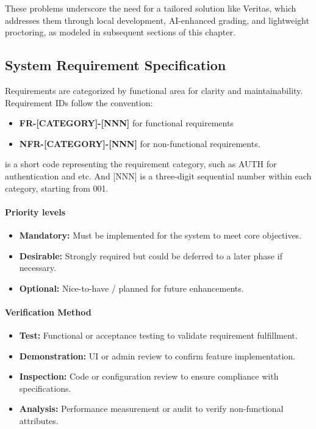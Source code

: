 These problems underscore the need for a tailored solution like Veritas, which addresses them through local development, AI-enhanced grading, and lightweight proctoring, as modeled in subsequent sections of this chapter.

\subsection{System Requirement Specification}
Requirements are categorized by functional area for clarity and maintainability. Requirement IDs follow the convention:
\begin{itemize}
    \item \textbf{FR-[CATEGORY]-[NNN]} for functional requirements 
    \item \textbf{NFR-[CATEGORY]-[NNN]} for non-functional requirements.
\end{itemize}

\noindent{[CATEGORY]} is a short code representing the requirement category, such as AUTH for authentication and etc. And 
[NNN] is a three-digit sequential number within each category, starting from 001.

\paragraph*{Priority levels}
\begin{itemize}
    \item \textbf{Mandatory:} Must be implemented for the system to meet core objectives.
    \item \textbf{Desirable:} Strongly required but could be deferred to a later phase if necessary.
    \item \textbf{Optional:} Nice-to-have / planned for future enhancements.
\end{itemize}

\paragraph*{Verification Method}
\begin{itemize}
    \item \textbf{Test:} Functional or acceptance testing to validate requirement fulfillment.
    \item \textbf{Demonstration:} UI or admin review to confirm feature implementation.
    \item \textbf{Inspection:} Code or configuration review to ensure compliance with specifications.
    \item \textbf{Analysis:} Performance measurement or audit to verify non-functional attributes.
\end{itemize}

